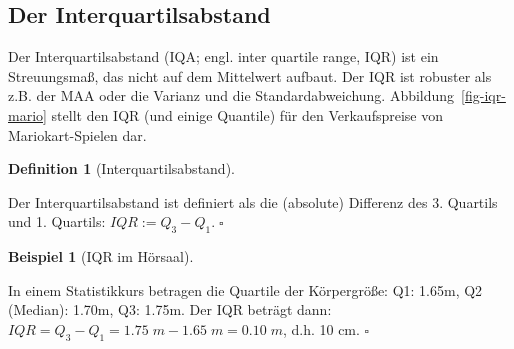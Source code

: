 \documentclass[
  letterpaper,
  twoside,
  open=any]{scrbook}
\theoremstyle{definition}
\newtheorem{definition}{Definition}[chapter]
\theoremstyle{definition}
\theoremstyle{definition}
\newtheorem{example}{Beispiel}[chapter]
\theoremstyle{remark}
\begin{document}
\subsection{Der Interquartilsabstand}\label{der-interquartilsabstand}

Der Interquartilsabstand (IQA; engl. inter quartile range, IQR) ist ein
Streuungsmaß, das nicht auf dem Mittelwert aufbaut. Der IQR ist robuster
als z.B. der MAA oder die Varianz und die Standardabweichung.
Abbildung~\ref{fig-iqr-mario} stellt den IQR (und einige Quantile) für
den Verkaufspreise von Mariokart-Spielen dar.

\begin{definition}[Interquartilsabstand]\protect\hypertarget{def-iqr}{}\label{def-iqr}

Der Interquartilsabstand ist definiert als die (absolute) Differenz des
3. Quartils und 1. Quartils: \(IQR := Q_3-Q_1. \; \square\)

\end{definition}

\begin{example}[IQR im
Hörsaal]\protect\hypertarget{exm-iqr}{}\label{exm-iqr}

In einem Statistikkurs betragen die Quartile der Körpergröße: Q1: 1.65m,
Q2 (Median): 1.70m, Q3: 1.75m. Der IQR beträgt dann:
\(IQR = Q_3-Q_1 = 1.75 \; m - 1.65\;  m = 0.10\; m\), d.h. 10 cm.
\(\square\)

\end{example}
\end{document}
